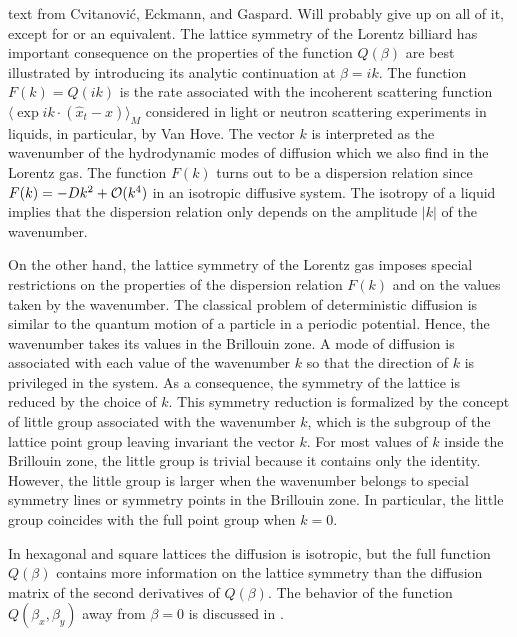     {text from Cvitanovi\'c,  Eckmann, and Gaspard.
    Will probably give up on all of it, except for 
    or an equivalent.}
The lattice symmetry of the Lorentz billiard has important consequence on
the properties of the function $Q(\beta)$ are best illustrated by
introducing its analytic continuation at $\beta = i k$.  The function
$F(k)=Q(ik)$ is the rate associated with the incoherent scattering
function $\langle \exp i k \cdot (\hat x_t - x) \rangle_M$ considered in
light or neutron scattering experiments in liquids, in particular, by Van
Hove. The vector $k$ is interpreted as the
wavenumber of the hydrodynamic modes of diffusion which we also find in
the Lorentz gas.  The function $F(k)$ turns out to be a dispersion
relation since $F(k)=-D k^2 + {\cal O}(k^4)$ in an isotropic diffusive
system.  The isotropy of a liquid implies that the dispersion relation
only depends on the amplitude $\vert k\vert$ of the wavenumber.

On the other hand, the lattice symmetry of the Lorentz gas
imposes special restrictions on the properties of the dispersion relation
$F(k)$ and on the values taken by the wavenumber.  The classical
problem of deterministic diffusion is similar to the quantum motion of a particle in a
periodic potential.  Hence, the wavenumber takes its values in the
Brillouin zone.  A mode of diffusion is associated with each value of
the wavenumber $k$ so that the direction of $k$ is privileged in the
system.  As a consequence, the symmetry of the lattice is reduced by the choice
of $k$.  This symmetry reduction is formalized by the concept of little group
associated with the wavenumber $k$, which is the subgroup of the lattice point
group leaving invariant the vector $k$.  For most values of $k$ inside the
Brillouin zone, the little group is trivial because it contains only the
identity.  However, the little group is larger when the wavenumber belongs to
special symmetry lines or symmetry points in the Brillouin zone.  In particular,
the little group coincides with the full point group when $k=0$.

In hexagonal and square lattices the diffusion is isotropic, but the
full function $Q(\beta)$ contains more information on the lattice
symmetry than the diffusion matrix of the second derivatives of
$Q(\beta)$. The behavior of the function $Q(\beta_x, \beta_y)$ away from
$\beta=0$ is discussed in .

